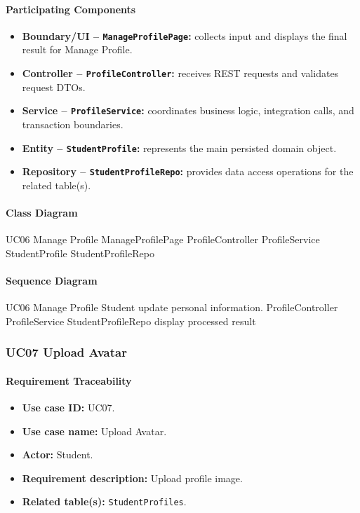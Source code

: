 \paragraph{Participating Components}

\begin{itemize}
    \item \textbf{Boundary/UI -- \texttt{ManageProfilePage}:} collects input and displays the final result for Manage Profile.
    \item \textbf{Controller -- \texttt{ProfileController}:} receives REST requests and validates request DTOs.
    \item \textbf{Service -- \texttt{ProfileService}:} coordinates business logic, integration calls, and transaction boundaries.
    \item \textbf{Entity -- \texttt{StudentProfile}:} represents the main persisted domain object.
    \item \textbf{Repository -- \texttt{StudentProfileRepo}:} provides data access operations for the related table(s).
\end{itemize}

\paragraph{Class Diagram}

\ClassDiagram
{UC06 Manage Profile}
{ManageProfilePage}
{ProfileController}
{ProfileService}
{StudentProfile}
{StudentProfileRepo}

\paragraph{Sequence Diagram}

\SequenceDiagram
{UC06 Manage Profile}
{Student}
{update personal information.}
{ProfileController}
{ProfileService}
{StudentProfileRepo}
{display processed result}

\subsubsection{UC07 Upload Avatar}

\paragraph{Requirement Traceability}

\begin{itemize}
    \item \textbf{Use case ID:} UC07.
    \item \textbf{Use case name:} Upload Avatar.
    \item \textbf{Actor:} Student.
    \item \textbf{Requirement description:} Upload profile image.
    \item \textbf{Related table(s):} \texttt{StudentProfiles}.
\end{itemize}

